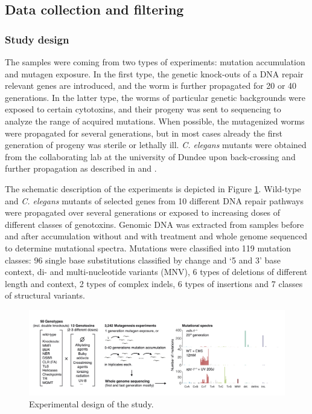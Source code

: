 \subsection{Data collection and filtering}

\subsubsection*{Study design}

The samples were coming from two types of experiments: mutation accumulation and mutagen exposure. 
In the first type, the genetic knock-outs of a DNA repair relevant genes are introduced, and the 
worm is further propagated for 20 or 40 generations. In the latter type, the worms of particular 
genetic backgrounds were exposed to certain cytotoxins, and their progeny was sent to sequencing 
to analyze the range of acquired mutations. When possible, the mutagenized worms were propagated 
for several generations, but in most cases already the first generation of progeny was sterile 
or lethally ill. \textit{C. elegans} mutants were obtained from the collaborating lab at the 
university of Dundee upon back-crossing and further propagation as described in \cite{Meier2014-aa} 
and \cite{Meier2018-qz}.

The schematic description of the experiments is depicted in Figure \ref{exp_types}. Wild-type 
and \textit{C. elegans} mutants of selected genes from 10 different DNA repair pathways 
were propagated over several generations or exposed to increasing doses of different 
classes of genotoxins. Genomic DNA was extracted from samples before and after 
accumulation without and with treatment and whole genome sequenced to determine 
mutational spectra. Mutations were classified into 119 mutation classes: 96 single 
base substitutions classified by change and ‘5 and 3’ base context, di- and 
multi-nucleotide variants (MNV), 6 types of deletions of different length and 
context, 2 types of complex indels, 6 types of insertions and 7 classes of structural variants.

\begin{figure}
  \centering
  \centerline{\includegraphics[width=1\textwidth]{figures/thesis_figure_worm_experiment.jpg}}
  \caption{Experimental design of the study.}
  \label{exp_types}
\end{figure}

